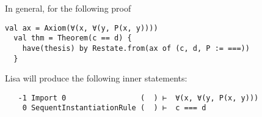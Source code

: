 In general, for the following proof
\begin{lstlisting}[language=lisa, frame=single]
  val ax = Axiom(∀(x, ∀(y, P(x, y))))
  val thm = Theorem(c == d) {
    have(thesis) by Restate.from(ax of (c, d, P := ===))
  }
\end{lstlisting}
Lisa will produce the following inner statements:
\begin{lstlisting}
   -1 Import 0                 (  ) ⊢  ∀(x, ∀(y, P(x, y)))
    0 SequentInstantiationRule (  ) ⊢  c === d
\end{lstlisting}

